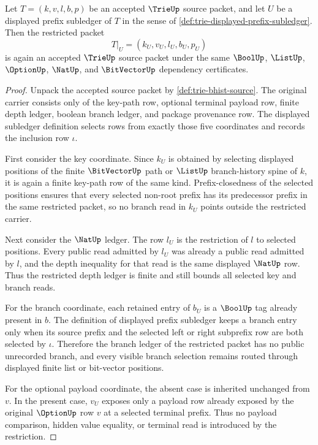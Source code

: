 \begin{theorem}\label{thm:trie-prefix-subledger-restriction-carrier}
Let $T=(k,v,l,b,p)$ be an accepted $\TrieUp$ source packet, and let $U$ be a displayed prefix subledger of $T$ in the sense of \autoref{def:trie-displayed-prefix-subledger}. Then the restricted packet
$$
T|_U=(k_U,v_U,l_U,b_U,p_U)
$$
is again an accepted $\TrieUp$ source packet under the same $\BoolUp$, $\ListUp$, $\OptionUp$, $\NatUp$, and $\BitVectorUp$ dependency certificates.
\end{theorem}
\begin{proof}
Unpack the accepted source packet by \autoref{def:trie-bhist-source}. The original carrier consists only of the key-path row, optional terminal payload row, finite depth ledger, boolean branch ledger, and package provenance row. The displayed subledger definition selects rows from exactly those five coordinates and records the inclusion row $\iota$.

First consider the key coordinate. Since $k_U$ is obtained by selecting displayed positions of the finite $\BitVectorUp$ path or $\ListUp$ branch-history spine of $k$, it is again a finite key-path row of the same kind. Prefix-closedness of the selected positions ensures that every selected non-root prefix has its predecessor prefix in the same restricted packet, so no branch read in $k_U$ points outside the restricted carrier.

Next consider the $\NatUp$ ledger. The row $l_U$ is the restriction of $l$ to selected positions. Every public read admitted by $l_U$ was already a public read admitted by $l$, and the depth inequality for that read is the same displayed $\NatUp$ row. Thus the restricted depth ledger is finite and still bounds all selected key and branch reads.

For the branch coordinate, each retained entry of $b_U$ is a $\BoolUp$ tag already present in $b$. The definition of displayed prefix subledger keeps a branch entry only when its source prefix and the selected left or right subprefix row are both selected by $\iota$. Therefore the branch ledger of the restricted packet has no public unrecorded branch, and every visible branch selection remains routed through displayed finite list or bit-vector positions.

For the optional payload coordinate, the absent case is inherited unchanged from $v$. In the present case, $v_U$ exposes only a payload row already exposed by the original $\OptionUp$ row $v$ at a selected terminal prefix. Thus no payload comparison, hidden value equality, or terminal read is introduced by the restriction.


\end{proof}
